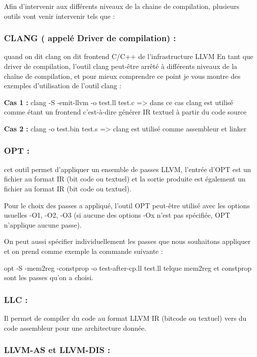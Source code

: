 \documentclass[12pt,titlepage]{article}
\begin{document}
Afin d’intervenir aux différents niveaux de la chaine de compilation, plusieurs outils vont venir intervenir tels que :

   \subsubsection{ CLANG ( appelé Driver de compilation) :} quand on dit clang on dit frontend C/C++ de l’infrastructure LLVM
En tant que driver de compilation, l’outil clang peut-être arrêté à différents niveaux de la chaîne de compilation, et pour mieux comprendre ce point je vous montre des exemples d’utilisation de l’outil clang :
      
	\textbf{Cas 1 : } clang -S -emit-llvm -o test.ll test.c => dans ce cas clang est utilisé comme étant un frontend c'est-à-dire générer IR textuel à partir du code source 
      
    \textbf{Cas 2 : }clang -o test.bin test.s => clang est utilisé comme assembleur et linker 
      
      
    \subsubsection{ OPT :} cet outil permet d’appliquer un ensemble de passes LLVM, l’entrée d'OPT est un fichier au format IR (bit code ou textuel) et la sortie produite est également un fichier au format IR (bit code ou textuel).
      
Pour le choix des passes a appliqué, l’outil OPT peut-être utilisé avec les options usuelles -O1, -O2, -O3 (si aucune des options -Ox n’est pas spécifiée, OPT n’applique aucune passe).
      
      On peut aussi spécifier individuellement les passes que nous souhaitons appliquer et on prend comme exemple la commande suivante  :
      
      opt -S -mem2reg -constprop -o test-after-cp.ll test.ll
      telque mem2reg  et constprop  sont les passes qu’on a choisi.

    \subsubsection{ LLC :} Il permet de compiler du code au format LLVM IR (bitcode ou textuel) vers du code assembleur pour une architecture donnée. 
      
    \subsubsection{LLVM-AS et LLVM-DIS : } 
    
\end{document}
